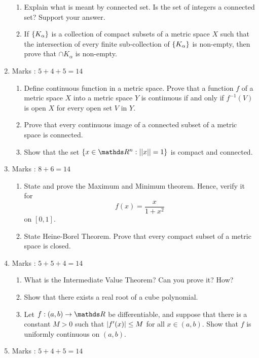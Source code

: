 \documentclass[../main-sheet.tex]{subfiles}
\begin{document}
\begin{enumerate}
\begin{enumerate}
              \item Explain what is meant by connected set. Is the set of integers a connected set? Support your answer.
              \item If $ \left\{K_\alpha\right\} $ is a collection of compact subsets of a metric space $ X $ such that the intersection of every finite sub-collection of $ \left\{K_\alpha\right\} $ is non-empty, then prove that $ \cap K_\alpha $ is non-empty.
            \end{enumerate}
    \item Marks : $ 5+4+5=14 $
        \begin{enumerate}
            \item Define continuous function in a metric space. Prove that a function $ f $ of a metric space $ X $ into a metric space $ Y $ is continuous if and only if  $ f^{-1}(V) $ is open $ X $ for every open set $ V $ in $ Y $.
            \item Prove that every continuous image of a connected subset of a metric space is connected.
            \item Show that the set $ \set{x \in \R^n : \norm{x} = 1} $ is compact and connected.
        \end{enumerate}\newpage
    \item Marks : $ 8+6=14 $
        \begin{enumerate}
            \item State and prove the Maximum and Minimum theorem. Hence, verify it for
            \[
                f(x)=\frac{x}{1+x^2}
            \]
            on $ [0, 1] $.
            \item State Heine-Borel Theorem. Prove that every compact subset of a metric space is closed.
        \end{enumerate}
    \item Marks : $ 5+5+4=14 $
        \begin{enumerate}
            \item What is the Intermediate Value Theorem? Can you prove it? How?
            \item Show that there exists a real root of a cube polynomial.
            \item Let $ f: (a,b) \to \R $ be differentiable, and suppose that there is a constant $ M > 0 $ such that $ \left\vert f'(x)\right\vert \leq M $ for all $ x \in (a,b) $. Show that $ f $ is uniformly continuous on $ (a, b) $.
        \end{enumerate}
    \item Marks : $ 5+4+5=14 $

\end{enumerate}
\end{document}

